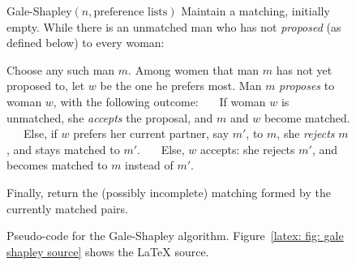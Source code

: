 \begin{figure}
\begin{myframed}\small
\begin{steps}
  \item[] {\sf Gale-Shapley}$(n, \text{preference lists})$ 
  \step Maintain a matching, initially empty.
  \step While there is an unmatched man who has not \emph{proposed} (as defined below) to every woman:
  \begin{block}
    \step Choose any such man $m$.
    \step\label{latex: S0} Among women that man $m$ has not yet proposed to, let $w$ be the one he prefers most.
    \step Man $m$ \emph{proposes} to woman $w$, with the following outcome:
    \step~~~If woman $w$ is unmatched, she \emph{accepts} the proposal, and $m$ and $w$ become matched.
    \step~~~Else, if $w$ prefers her current partner, say $m'$, to $m$, she \emph{rejects} $m$, and stays matched to $m'$.
    \step~~~Else, $w$ accepts: she rejects $m'$, and becomes matched to $m$ instead of $m'$.
  \end{block}
  \step Finally, return the (possibly incomplete) matching formed by the currently matched pairs.
\end{steps}
\end{myframed}
\caption{Pseudo-code for the Gale-Shapley algorithm.
  Figure~\ref{latex: fig: gale shapley source} shows the LaTeX source.}\label{latex: fig: gale shapley}
\end{figure}

